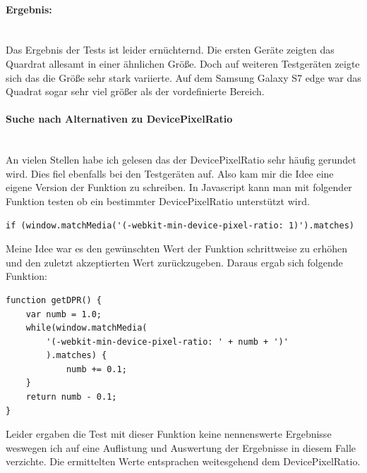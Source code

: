\paragraph{Ergebnis:}
\mbox{}\\
Das Ergebnis der Tests ist leider ernüchternd. Die ersten Geräte zeigten das Quardrat allesamt in einer ähnlichen Größe. Doch auf weiteren Testgeräten zeigte sich das die Größe sehr stark variierte. Auf dem Samsung Galaxy S7 edge war das Quadrat sogar sehr viel größer als der vordefinierte Bereich.
\newpage
\paragraph{Suche nach Alternativen zu DevicePixelRatio}
\mbox{}\\
An vielen Stellen habe ich gelesen das der DevicePixelRatio sehr häufig gerundet wird. Dies fiel ebenfalls bei den Testgeräten auf.
\newline
Also kam mir die Idee eine eigene Version der Funktion zu schreiben. In Javascript kann man mit folgender Funktion testen ob ein bestimmter DevicePixelRatio unterstützt wird.
\begin{lstlisting}
if (window.matchMedia('(-webkit-min-device-pixel-ratio: 1)').matches) 
\end{lstlisting}
Meine Idee war es den gewünschten Wert der Funktion schrittweise zu erhöhen und den zuletzt akzeptierten Wert zurückzugeben.
\newline
Daraus ergab sich folgende Funktion:
\begin{lstlisting}
function getDPR() {
    var numb = 1.0;
    while(window.matchMedia(
    	'(-webkit-min-device-pixel-ratio: ' + numb + ')'
    	).matches) {
        	numb += 0.1;
    }
    return numb - 0.1;
}
\end{lstlisting}
Leider ergaben die Test mit dieser Funktion keine nennenswerte Ergebnisse weswegen ich auf eine Auflistung und Auswertung der Ergebnisse in diesem Falle verzichte.
\newline
Die ermittelten Werte entsprachen weitesgehend dem DevicePixelRatio.
